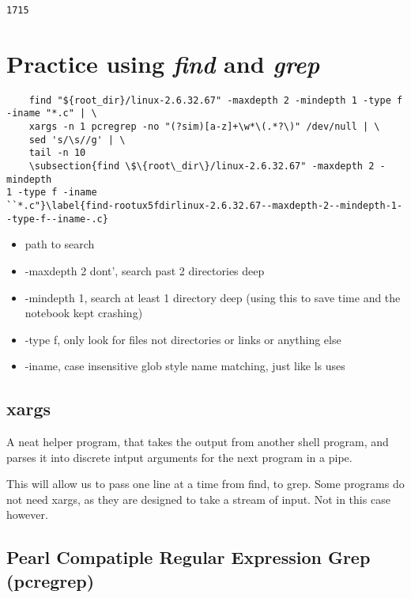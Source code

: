 \documentclass{article}
\begin{document}
    \begin{Verbatim}[commandchars=\\\{\}]
1715
    \end{Verbatim}

    \section{Practice using \emph{find} and
\emph{grep}}\label{practice-using-find-and-grep}
\begin{Verbatim}
    find "${root_dir}/linux-2.6.32.67" -maxdepth 2 -mindepth 1 -type f -iname "*.c" | \
    xargs -n 1 pcregrep -no "(?sim)[a-z]+\w*\(.*?\)" /dev/null | \
    sed 's/\s//g' | \
    tail -n 10
    \subsection{find \$\{root\_dir\}/linux-2.6.32.67" -maxdepth 2 -mindepth
1 -type f -iname
``*.c"}\label{find-rootux5fdirlinux-2.6.32.67--maxdepth-2--mindepth-1--type-f--iname-.c}
\end{Verbatim}

\begin{itemize}
\itemsep1pt\parskip0pt
\item
  path to search
\item
  -maxdepth 2 dont', search past 2 directories deep
\item
  -mindepth 1, search at least 1 directory deep (using this to save time
  and the notebook kept crashing)
\item
  -type f, only look for files not directories or links or anything else
\item
  -iname, case insensitive glob style name matching, just like ls uses
\end{itemize}

\subsection{xargs}\label{xargs}

A neat helper program, that takes the output from another shell program,
and parses it into discrete intput arguments for the next program in a
pipe.

This will allow us to pass one line at a time from find, to grep. Some
programs do not need xargs, as they are designed to take a stream of
input. Not in this case however.

\subsection{Pearl Compatiple Regular Expression Grep (pcregrep)}
\end{document}
